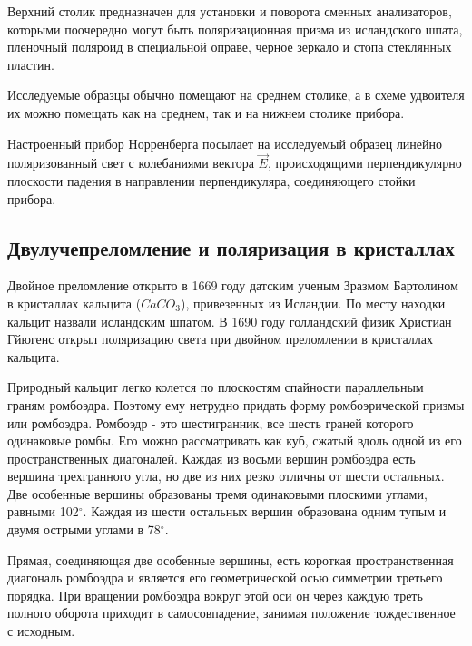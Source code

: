 Верхний столик предназначен для установки и поворота смен­ных анализаторов, которыми поочередно могут быть поляризацион­ная призма из исландского шпата, пленочный поляроид в специальной оправе, черное зеркало и стопа стеклянных пластин.

Исследуемые образцы обычно помещают на среднем столике, а в схеме удвоителя их можно помещать как на среднем, так и на нижнем столике прибора.

Настроенный прибор Норренберга посылает на исследуемый образец линейно поляризованный свет с колебаниями вектора $\vec{E}$, происходящими перпендикулярно плоскости падения в направлении
перпендикуляра, соединяющего стойки прибора.
\subsection*{Двулучепреломление и поляризация в кристаллах}

Двойное преломление открыто в 1669 году датским ученым Зразмом Бартолином в кристаллах кальцита ($CaCO_3$), привезенных из Исландии. По месту находки кальцит назвали исландским шпа­том. В 1690 году голландский физик Христиан Гйюгенс открыл поляризацию света при двойном преломлении в кристаллах кальцита.

Природный кальцит легко колется по плоскостям спайности
параллельным граням ромбоэдра. Поэтому ему нетрудно придать
форму ромбоэрической призмы или ромбоэдра. Ромбоэдр - это шестигранник, все шесть граней которого одинаковые ромбы. Его можно
рассматривать как куб, сжатый вдоль одной из его пространствен­ных диагоналей. Каждая из восьми вершин ромбоэдра есть вершина
трехгранного угла, но две из них резко отличны от шести остальных. Две особенные вершины образованы тремя одинаковыми плоскими углами, равными 102$^\circ$. Каждая из шести остальных вершин образована  одним тупым и двумя острыми углами в 78$^\circ$.

Прямая, соединяющая две особенные вершины, есть короткая
пространственная диагональ ромбоэдра и является его геометрической осью симметрии третьего порядка. При вращении ромбоэдра
вокруг этой оси он через каждую треть полного оборота приходит
в самосовпадение, занимая положение тождественное с исходным.

